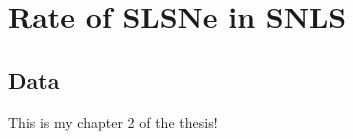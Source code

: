 
\chapter{Rate of SLSNe in SNLS} %
\label{Chapter2}


\section{Data}
This is my chapter 2 of the thesis!
